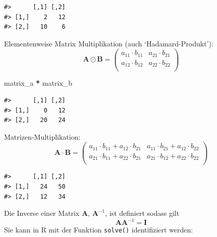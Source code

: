 \documentclass[]{book}
\newenvironment{Shaded}{\begin{snugshade}}{\end{snugshade}}
\newcommand{\StringTok}[1]{\textcolor[rgb]{0.31,0.60,0.02}{#1}}
\newcommand{\OperatorTok}[1]{\textcolor[rgb]{0.81,0.36,0.00}{\textbf{#1}}}
\newcommand{\NormalTok}[1]{#1}
\begin{document}
\begin{verbatim}
#>      [,1] [,2]
#> [1,]    2   12
#> [2,]   10    6
\end{verbatim}

Elementenweise Matrix Multiplikation (auch `Hadamard-Produkt'):
\[\boldsymbol{A}\odot\boldsymbol{B}=
\left(
\begin{array}{rrr}                                
a_{11}\cdot b_{11} & a_{21}\cdot b_{21}\\                                               
a_{12}\cdot b_{12} & a_{22}\cdot b_{22}\\                                               
\end{array}
\right)\]

\begin{Shaded}
\begin{Highlighting}[]
\NormalTok{matrix_a }\OperatorTok{*}\StringTok{ }\NormalTok{matrix_b}
\end{Highlighting}
\end{Shaded}

\begin{verbatim}
#>      [,1] [,2]
#> [1,]    0   12
#> [2,]   20   24
\end{verbatim}

Matrizen-Multiplikation: \[\boldsymbol{A}\cdot\boldsymbol{B}=
\left(
\begin{array}{rrr}                                
a_{11}\cdot b_{11} + a_{12}\cdot b_{21} & a_{11}\cdot b_{21}+a_{12}\cdot b_{22}\\                     a_{21}\cdot b_{11} + a_{22}\cdot b_{21} & a_{21}\cdot b_{12}+a_{22}\cdot b_{22}\\                     
\end{array}
\right)
\]

\begin{Shaded}
\end{Shaded}

\begin{verbatim}
#>      [,1] [,2]
#> [1,]   24   50
#> [2,]   12   34
\end{verbatim}

Die Inverse einer Matrix \(\boldsymbol{A}\), \(\boldsymbol{A}^{-1}\),
ist definiert sodass gilt
\[\boldsymbol{A}\boldsymbol{A}^{-1}=\boldsymbol{I}\] Sie kann in R mit
der Funktion \texttt{solve()} identifiziert werden:
\end{document}
